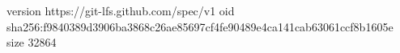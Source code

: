 version https://git-lfs.github.com/spec/v1
oid sha256:f9840389d3906ba3868c26ae85697cf4fe90489e4ca141cab63061ccf8b1605e
size 32864
